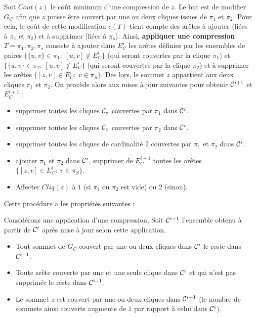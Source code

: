 Soit  $Cout(z)$ le co\^ut minimum d'une compression de $z$.
Le but est de modifier $G_C$ afin que $z$ puisse \^etre couvert par une ou deux cliques issues de $\pi_1$ et $\pi_2$.
Pour cela, le co\^ut de cette modification $c(T)$ tient compte des ar\^etes \`a ajouter (li\'ees \`a $\pi_1$ et $\pi_2$) et \`a supprimer (li\'ees \`a $\pi_s$).
\newline
Ainsi, {\bf appliquer une compression} $T = \pi_1, \pi_2, \pi_s$ consiste \`a ajouter dans $E_C^i$ les ar\^etes d\'efinies par les ensembles de paires $\{\{u,v\} \in \pi_1:~[u,v]\not\in E_{C}^{i}\}$ (qui seront couvertes par la clique $\pi_1$) et $\{\{u,v\} \in \pi_2:~[u,v]\not\in  E_{C}^{i}\}$ (qui seront couvertes par la clique $\pi_2$) et \`a supprimer les ar\^etes $\{[z,v] \in  E_{C}^{i}:~v\in \pi_S\}$. 
\newline
Des lors, le sommet $z$ appartient aux deux cliques $\pi_1$ et $\pi_2$.
On proc\`ede alors aux mises \`a jour suivantes pour obtenir ${\cal C}^{i+1}$ et $E_C^{i+1}$ :
\begin{itemize}
\item supprimer toutes les cliques ${\cal C}_z$ couvertes par $\pi_1$ dans  ${\cal C}^{i}$.
\item supprimer toutes les cliques ${\cal C}_z$ couvertes par $\pi_2$ dans  ${\cal C}^{i}$.
\item supprimer toutes les cliques de cardinalit\'e $2$ couvertes par $\pi_1$ et $\pi_2$ dans  ${\cal C}^{i}$.
\item ajouter $\pi_1$ et $\pi_2$ dans ${\cal C}^{i}$, supprimer de $E_C^{i+1}$ toutes les ar\^etes  $\{[z,v] \in E_C^{i}:~v\in \pi_S\}$.
\item Affecter $Cliq(z)$ \`a $1$ (si $\pi_1$  ou $\pi_2$ est vide) ou $2$ (sinon).
\end{itemize}
Cette proc\'edure a les propri\'et\'es suivantes :
\begin{property}
Consid\'erons une application d'une compression,
Soit ${\cal C}^{i+1}$  l'ensemble obtenu \`a partir de ${\cal C}^{i}$ apr\`es  mise \`a jour selon cette application.
\begin{itemize}
	\item Tout sommet de $G_C$ couvert par une ou deux cliques dans ${\cal C}^{i}$ le reste dans ${\cal C}^{i+1}$.
	\item Toute ar\^ete couverte par une et une seule clique dans ${\cal C}^{i}$ et qui n'est pas supprim\'ee le reste dans ${\cal C}^{i+1}$.
	\item Le sommet $z$ est couvert par une ou deux cliques dans ${\cal C}^{i+1}$ (le nombre de sommets ainsi couverts augmente de $1$ par rapport \`a celui dans ${\cal C}^{i}$).
\end{itemize}
\end{property}

